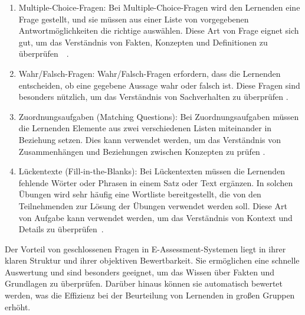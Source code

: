 \begin{enumerate}
    \item Multiple-Choice-Fragen: Bei Multiple-Choice-Fragen wird den Lernenden eine Frage gestellt, und sie müssen aus einer Liste von vorgegebenen Antwortmöglichkeiten die richtige auswählen. Diese Art von Frage eignet sich gut, um das Verständnis von Fakten, Konzepten und Definitionen zu überprüfen~\cite{azevedo2019assessment}~\cite{azevedo2015assessment}.

    \item Wahr/Falsch-Fragen: Wahr/Falsch-Fragen erfordern, dass die Lernenden entscheiden, ob eine gegebene Aussage wahr oder falsch ist. Diese Fragen sind besonders nützlich, um das Verständnis von Sachverhalten zu überprüfen \cite{khdour2020semantic}.

    \item Zuordnungsaufgaben (Matching Questions): Bei Zuordnungsaufgaben müssen die Lernenden Elemente aus zwei verschiedenen Listen miteinander in Beziehung setzen. Dies kann verwendet werden, um das Verständnis von Zusammenhängen und Beziehungen zwischen Konzepten zu prüfen \cite{gruttmann2009formatives}.

    \item Lückentexte (Fill-in-the-Blanks): Bei Lückentexten müssen die Lernenden fehlende Wörter oder Phrasen in einem
    Satz oder Text ergänzen. In solchen Übungen wird sehr häufig eine Wortliste bereitgestellt, die von den
    Teilnehmenden zur Lösung der Übungen verwendet werden soll. Diese Art von Aufgabe kann verwendet werden, um das
    Verständnis von Kontext und Details zu überprüfen~\cite{gruttmann2009formatives}.
    
\end{enumerate}

Der Vorteil von geschlossenen Fragen in E-Assessment-Systemen liegt in ihrer klaren Struktur und ihrer objektiven Bewertbarkeit. Sie ermöglichen eine schnelle Auswertung und sind besonders geeignet, um das Wissen über Fakten und Grundlagen zu überprüfen. Darüber hinaus können sie automatisch bewertet werden, was die Effizienz bei der Beurteilung von Lernenden in großen Gruppen erhöht.

